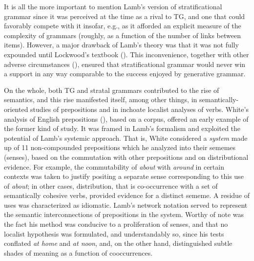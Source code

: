 \documentclass[output=paper]{langscibook}
\begin{document}
It is all the more important to mention Lamb’s version of stratificational grammar since it was perceived at the time as a rival to TG, and one that could favorably compete with it insofar, e.g., as it afforded an explicit measure of the complexity of grammars (roughly, as a function of the number of links between items). However, a major drawback of Lamb’s theory was that it was not fully expounded until Lockwood’s textbook (\citealt{lockwood_introduction_1972}). This inconvenience, together with other adverse circumstances (\citealt{nielsen_private_2010}), ensured that stratificational grammar would never win a support in any way comparable to the success enjoyed by generative grammar.

On the whole, both TG and stratal grammars contributed to the rise of semantics, and this rise manifested itself, among other things, in semantically-oriented studies of prepositions and in inchoate localist analyses of verbs. White’s analysis of English prepositions (\citealt{white_methodology_1964}), based on a corpus, offered an early example of the former kind of study. It was framed in Lamb’s formalism and exploited the potential of Lamb’s systemic approach. That is, White considered a \textit{system} made up of 11 non-compounded prepositions which he analyzed into their sememes (senses), based on the commutation with other prepositions and on distributional evidence. For example, the commutability of \textit{about} with \textit{around} in certain contexts was taken to justify positing a separate sense corresponding to this use of \textit{about}; in other cases, distribution, that is co-occurrence with a set of semantically cohesive verbs, provided evidence for a distinct sememe. A residue of uses was characterized as idiomatic. Lamb’s network notation served to represent the semantic interconnections of prepositions in the system. Worthy of note was the fact his method was conducive to a proliferation of senses, and that no localist hypothesis was formulated, and understandably so, since his tests conflated \textit{at home} and \textit{at noon}, and, on the other hand, distinguished subtle shades of meaning as a function of cooccurrences.
\end{document}
